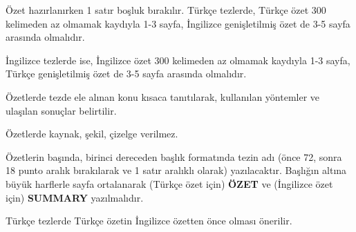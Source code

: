 \"Ozet haz\i rlan\i rken 1 sat\i r bo\c{s}luk b\i rak\i l\i r. T\"urk\c{c}e
tezlerde, T\"urk\c{c}e \"ozet 300 kelimeden az olmamak kayd\i yla 1-3 sayfa,
{\.I}ngilizce geni\c{s}letilmi\c{s} \"ozet de 3-5 sayfa aras\i nda 
olmal\i d\i r. 

{\.I}ngilizce tezlerde ise, {\.I}ngilizce \"ozet 300 kelimeden az olmamak
kayd\i yla 1-3 sayfa, T\"urk\c{c}e geni\c{s}letilmi\c{s} \"ozet de 
3-5 sayfa aras\i nda olmal\i d\i r. 

\"Ozetlerde tezde ele al\i nan konu k\i saca tan\i t\i larak, kullan\i lan
y\"ontemler ve ula\c{s}\i lan sonu\c{c}lar belirtilir.

\"Ozetlerde kaynak, \c{s}ekil, \c{c}izelge verilmez.

\"Ozetlerin ba\c{s}\i nda, birinci dereceden ba\c{s}l\i k format\i nda
tezin ad{\i} (\"once 72, sonra 18 punto aral\i k b{\i}rak{\i}larak ve 1
sat\i r aral\i kl{\i} olarak) yaz\i lacakt\i r. Ba\c{s}l\i \u{g}\i n
alt\i na b\"uy\"uk harflerle sayfa ortalanarak (T\"urk\c{c}e \"ozet i\c{c}in)
{\bf \"OZET} ve ({\.I}ngilizce \"ozet i\c{c}in) {\bf SUMMARY}
yaz\i lmal\i d\i r.

T\"urk\c{c}e tezlerde T\"urk\c{c}e \"ozetin \.Ingilizce \"ozetten 
\"once olmas{\i} \"onerilir.